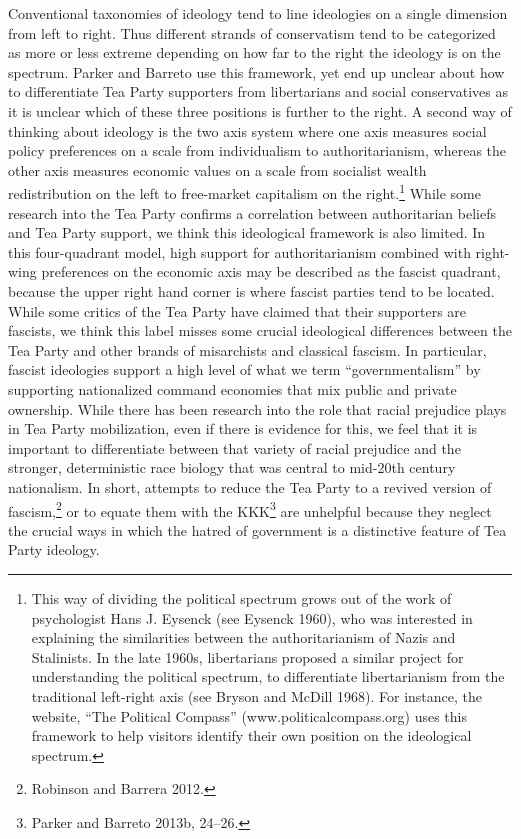 \documentclass[12pt,]{article}
\begin{document}
Conventional taxonomies of ideology tend to line ideologies on a single
dimension from left to right. Thus different strands of conservatism
tend to be categorized as more or less extreme depending on how far to
the right the ideology is on the spectrum. Parker and Barreto use this
framework, yet end up unclear about how to differentiate Tea Party
supporters from libertarians and social conservatives as it is unclear
which of these three positions is further to the right. A second way of
thinking about ideology is the two axis system where one axis measures
social policy preferences on a scale from individualism to
authoritarianism, whereas the other axis measures economic values on a
scale from socialist wealth redistribution on the left to free-market
capitalism on the right.\footnote{This way of dividing the political
  spectrum grows out of the work of psychologist Hans J. Eysenck (see
  Eysenck 1960), who was interested in explaining the similarities
  between the authoritarianism of Nazis and Stalinists. In the late
  1960s, libertarians proposed a similar project for understanding the
  political spectrum, to differentiate libertarianism from the
  traditional left-right axis (see Bryson and McDill 1968). For
  instance, the website, ``The Political Compass''
  (www.politicalcompass.org) uses this framework to help visitors
  identify their own position on the ideological spectrum.} While some
research into the Tea Party confirms a correlation between authoritarian
beliefs and Tea Party support, we think this ideological framework is
also limited. In this four-quadrant model, high support for
authoritarianism combined with right-wing preferences on the economic
axis may be described as the fascist quadrant, because the upper right
hand corner is where fascist parties tend to be located. While some
critics of the Tea Party have claimed that their supporters are
fascists, we think this label misses some crucial ideological
differences between the Tea Party and other brands of misarchists and
classical fascism. In particular, fascist ideologies support a high
level of what we term ``governmentalism'' by supporting nationalized
command economies that mix public and private ownership. While there has
been research into the role that racial prejudice plays in Tea Party
mobilization, even if there is evidence for this, we feel that it is
important to differentiate between that variety of racial prejudice and
the stronger, deterministic race biology that was central to mid-20th
century nationalism. In short, attempts to reduce the Tea Party to a
revived version of fascism,\footnote{Robinson and Barrera 2012. } or to
equate them with the KKK\footnote{Parker and Barreto 2013b, 24--26. }
are unhelpful because they neglect the crucial ways in which the hatred
of government is a distinctive feature of Tea Party ideology.
\end{document}
